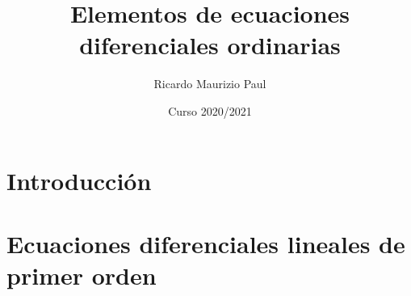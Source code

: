 \documentclass{report}
\title{Elementos de ecuaciones diferenciales ordinarias}
\author{Ricardo Maurizio Paul}
\date{Curso 2020/2021}
\begin{document}
\maketitle
\tableofcontents

\chapter{Introducción}


\chapter{Ecuaciones diferenciales lineales de primer orden}

\end{document}
